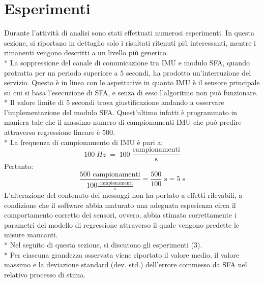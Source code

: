 \section{Esperimenti}
Durante l'attivit\`a di analisi sono stati effettuati numerosi esperimenti. In questa sezione, si riportano in dettaglio solo i risultati ritenuti pi\`u interessanti, mentre i rimanenti vengono descritti a un livello pi\`u generico.\\*
La soppressione del canale di comunicazione tra IMU e modulo SFA, quando protratta per un periodo superiore a $5$ secondi, ha prodotto un'interruzione del servizio. Questo \`e in linea con le aspettative in quanto IMU \`e il sensore principale su cui si basa l'esecuzione di SFA, e senza di esso l'algoritmo non pu\`o funzionare.\\*
Il valore limite di $5$ secondi trova giustificazione andando a osservare l'implementazione del modulo SFA. Quest'ultimo infatti \`e programmato in maniera tale che il massimo numero di campionamenti IMU che pu\`o predire attraverso regressione lineare \`e $500$.\\*
La frequenza di campionamento di IMU \`e pari a:
$$100\;Hz\;=\;100\; \frac{\mbox{campionamenti}}{\mbox{s}}$$ Pertanto:
$$
\frac{500 \mbox{ campionamenti}}{100\frac{ \mbox{  campionamenti}}{\mbox{s}}} = \frac{500}{100}\mbox{ s} = 5\mbox{ s}
$$
L'alterazione del contenuto dei messaggi non ha portato a effetti rilevabili, a condizione che il software abbia maturato una adeguata esperienza circa il comportamento corretto dei sensori, ovvero, abbia stimato correttamente i parametri del modello di regressione attraverso il quale vengono predette le misure mancanti.\\*
Nel seguito di questa sezione, si discutono gli esperimenti (3).\\*
Per ciascuna grandezza osservata viene riportato il valore medio, il valore
massimo e la deviazione standard (dev. std.) dell'errore commesso da SFA nel relativo processo di stima.

